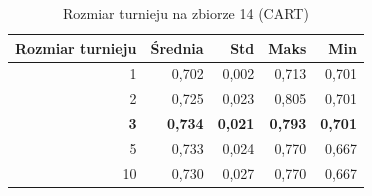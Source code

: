 \begin{table}[htbp]
\centering
\small
\setlength{\tabcolsep}{6pt}
\renewcommand{\arraystretch}{1.2}
\caption{Rozmiar turnieju na zbiorze 14 (CART)}
\label{tab:CART_tournament_size_14}
\begin{tabular}{r|r|r|r|r}
\toprule
Rozmiar turnieju & Średnia & Std & Maks & Min \\
\hline
1 & 0,702 & 0,002 & 0,713 & 0,701 \\
2 & 0,725 & 0,023 & 0,805 & 0,701 \\
\textbf{3} & \textbf{0,734} & \textbf{0,021} & \textbf{0,793} & \textbf{0,701} \\
5 & 0,733 & 0,024 & 0,770 & 0,667 \\
10 & 0,730 & 0,027 & 0,770 & 0,667 \\
\bottomrule
\end{tabular}
\end{table}